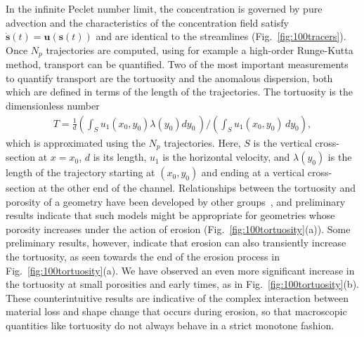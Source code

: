 \documentclass[11pt]{article}
\newcommand{\bvec}[1]{{\mathbf{#1}}}
\newcommand{\uu}{\bvec{u}}
\renewcommand{\ss}{{\mathbf{s}}}
\begin{document}
In the infinite Peclet number limit, the concentration is governed by pure advection and the characteristics of the concentration field satisfy $\dot{\ss}(t) = \uu(\ss(t))$ and are identical to the streamlines (Fig.~\ref{fig:100tracers}). Once $N_p$ trajectories are computed, using for example a high-order Runge-Kutta method, transport can be quantified. Two of the most important measurements to quantify transport are the tortuosity and the anomalous dispersion, both which are defined in terms of the length of the trajectories. The tortuosity is the dimensionless number 
\begin{align}
  T = \frac{1}{d} \left(\int_{S} u_1(x_0,y_0)\lambda(y_0) dy_0\, \right)
  \Bigg/ \left(\int_S u_1(x_0,y_0)\, dy_0 \right),
\end{align}
which is approximated using the $N_p$ trajectories. Here, $S$ is the vertical cross-section at $x=x_0$, $d$ is its length, $u_1$ is the horizontal velocity, and $\lambda(y_0)$ is the length of the trajectory starting at $(x_0,y_0)$ and ending at a vertical cross-section at the other end of the channel.  Relationships between the tortuosity and porosity of a geometry have been developed by other groups~\cite{kop-kat-tim1996, dud-koz-mat2011, mat-kha-koz2008}, and preliminary results indicate that such models might be appropriate for geometries whose porosity increases under the action of erosion (Fig.~\ref{fig:100tortuosity}(a)). Some preliminary results, however, indicate that erosion can also transiently increase the tortuosity, as seen towards the end of the erosion process in Fig.~\ref{fig:100tortuosity}(a). We have observed an even more significant increase in the tortuosity at small porosities and early times, as in Fig.~\ref{fig:100tortuosity}(b). These counterintuitive results are indicative of the complex interaction between material loss and shape change that occurs during erosion, so that macroscopic quantities like tortuosity do not always behave in a strict monotone fashion.  
\end{document}
